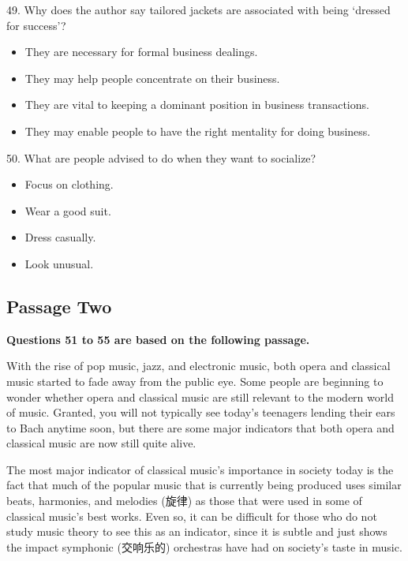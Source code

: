 \documentclass[UTF8,11pt]{ctexart}
\begin{document}
49. Why does the author say tailored jackets are associated with being ‘dressed for success’?


\begin{itemize}[leftmargin=2em,itemsep=.2em,topsep=.4em]\item[A.] They are necessary for formal business dealings.
\item[B.] They may help people concentrate on their business.
\item[C.] They are vital to keeping a dominant position in business transactions.
\item[D.] They may enable people to have the right mentality for doing business.
\end{itemize}

50. What are people advised to do when they want to socialize?


\begin{itemize}[leftmargin=2em,itemsep=.2em,topsep=.4em]\item[A.] Focus on clothing.
\item[B.] Wear a good suit.
\item[C.] Dress casually.
\item[D.] Look unusual.
\end{itemize}

\subsection*{\textbf{Passage Two}}


\textbf{Questions 51 to 55 are based on the following passage.}


With the rise of pop music, jazz, and electronic music, both opera and classical music started to fade away from the public eye. Some people are beginning to wonder whether opera and classical music are still relevant to the modern world of music. Granted, you will not typically see today’s teenagers lending their ears to Bach anytime soon, but there are some major indicators that both opera and classical music are now still quite alive.


The most major indicator of classical music’s importance in society today is the fact that much of the popular music that is currently being produced uses similar beats, harmonies, and melodies (旋律) as those that were used in some of classical music’s best works. Even so, it can be difficult for those who do not study music theory to see this as an indicator, since it is subtle and just shows the impact symphonic (交响乐的) orchestras have had on society’s taste in music.
\end{document}
